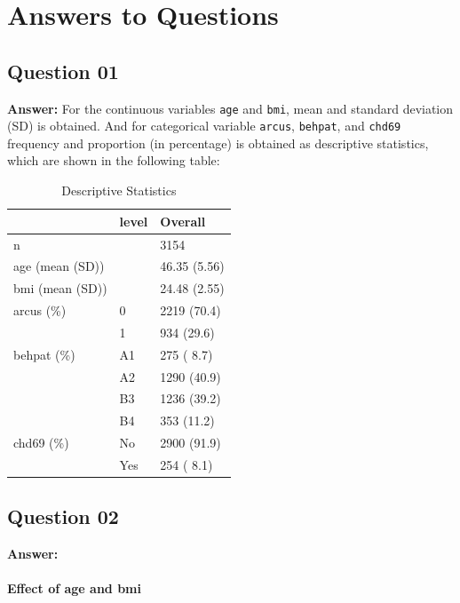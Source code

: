 \documentclass[
  12pt,
  oneside]{article}
\begin{document}
\hypertarget{answers-to-questions}{%
\section{Answers to Questions}\label{answers-to-questions}}

\hypertarget{question-01}{%
\subsection{Question 01}\label{question-01}}

\textbf{Answer:} For the continuous variables \texttt{age} and \texttt{bmi}, mean and standard deviation (SD) is obtained. And for categorical variable \texttt{arcus}, \texttt{behpat}, and \texttt{chd69} frequency and proportion (in percentage) is obtained as descriptive statistics, which are shown in the following table:

\begin{table}[H]

\caption{\label{tab:Table-01}Descriptive Statistics}
\centering
\begin{tabular}[t]{lll}
\toprule
  & level & Overall\\
\midrule
n &  & 3154\\
age (mean (SD)) &  & 46.35 (5.56)\\
bmi (mean (SD)) &  & 24.48 (2.55)\\
arcus (\%) & 0 & 2219 (70.4)\\
 & 1 & 934 (29.6)\\
\addlinespace
behpat (\%) & A1 & 275 ( 8.7)\\
 & A2 & 1290 (40.9)\\
 & B3 & 1236 (39.2)\\
 & B4 & 353 (11.2)\\
chd69 (\%) & No & 2900 (91.9)\\
\addlinespace
 & Yes & 254 ( 8.1)\\
\bottomrule
\end{tabular}
\end{table}

\clearpage

\hypertarget{question-02}{%
\subsection{Question 02}\label{question-02}}

\textbf{Answer:}

\hypertarget{effect-of-age-and-bmi}{%
\paragraph{Effect of age and bmi}\label{effect-of-age-and-bmi}}
\end{document}
